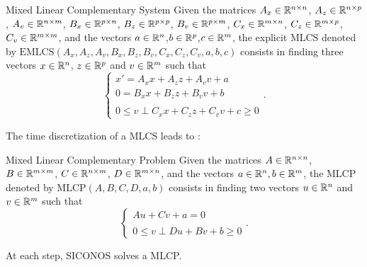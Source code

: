 
\frame
{
\begin{block}{Mixed Linear Complementary System}
  Given the matrices   ${A_{x}} \in \mathbb{R}^{n \times n}$, ${A_{z}} \in \mathbb{R}^{n \times
  p}$, ${A_{v}} \in \mathbb{R}^{n \times m}$, ${B_{x}} \in \mathbb{R}^{p \times n}$, ${B_{z}} \in \mathbb{R}^{p \times
  p}$, ${B_{v}} \in \mathbb{R}^{p \times m}$, ${C_{x}} \in \mathbb{R}^{m \times n}$, ${C_{z}} \in \mathbb{R}^{m \times p}$,${C_{v}} \in \mathbb{R}^{m \times m}$, and
  the vectors  $ {a} \in \mathbb{R}^n$,$ {b}  \in \mathbb{R}^p$,$ {c}  \in \mathbb{R}^m$, the explicit MLCS denoted by
  $\mathrm{EMLCS}(A_{x},A_{z},A_{v},B_{x},B_{z},B_{v},C_{x},C_{z},C_{v},a,b,c)$ consists in finding three vectors $ {x}
  \in \mathbb{R}^n$, $ {z} \in \mathbb{R}^p$ and  $ {v} \in \mathbb{R}^m$ such that
\begin{equation}\label{eq:mlcs2} 
  \begin{cases}
   x' = A_{x} x +A_{z} z +A_{v} v + a  \\
   0 = B_{x} x +B_{z} z + B_{v} v +b \\ \\
   {0} \le {v} \perp     C_{x} x+ C_{z}z +C_{v} v +c   \ge {0}
  \end{cases}.
\end{equation}
\end{block}
The time discretization of a MLCS leads to :
\begin{block}{Mixed Linear Complementary Problem}
  Given the matrices  ${A} \in \mathbb{R}^{n \times n}$, ${B} \in \mathbb{R}^{m \times m}$, ${C} \in \mathbb{R}^{n \times m}$, ${D} \in \mathbb{R}^{m \times n}$, and the vectors  $ {a} \in \mathbb{R}^n, {b} \in \mathbb{R}^m$, the MLCP denoted by $\mathrm{MLCP}(A,B,C,D,a,b)$ consists in finding two vectors $ {u} \in \mathbb{R}^n$ and  $ {v} \in \mathbb{R}^m$ such that
\begin{equation}\label{eq:mlcp1} 
  \begin{cases}
    A u + C v + a =0 \\  \\
    {0} \le {v} \perp     Du +B v +b   \ge {0}
  \end{cases}.
\end{equation}
\end{block}
At each step, SICONOS solves a MLCP.
}
